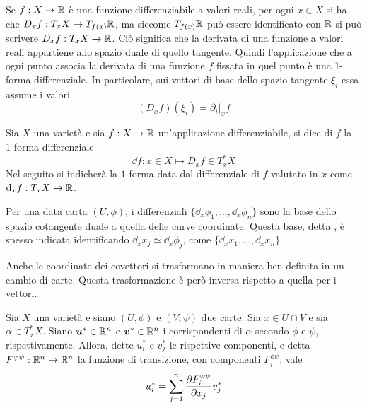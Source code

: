 Se $f:X \to \mathbb{R}$ è una funzione differenziabile a valori reali, per ogni $x \in X$ si ha che $D_x f: T_x X \to T_{f(x)}\mathbb{R}$, ma siccome $T_{f(x)}\mathbb{R}$ può essere identificato con $\mathbb{R}$ si può scrivere $D_x f: T_x X \to \mathbb{R}$. Ciò significa che la derivata di una funzione a valori reali appartiene allo spazio duale di quello tangente. Quindi l'applicazione che a ogni punto associa la derivata di una funzione $f$ fissata in quel punto è una 1-forma differenziale. In particolare, sui vettori di base dello spazio tangente $\xi_i$ essa assume i valori \begin{equation}
(D_x f)(\xi_i) = \partial_i|_x f
\end{equation} 
\begin{definition} \label{def:differential}
  Sia $X$ una varietà e sia $f:X\to \mathbb{R}$ un'applicazione differenziabile, si dice  di $f$ la 1-forma differenziale \begin{equation}
  \dd f: x \in X \mapsto D_x f \in T_x^* X
  \end{equation}
  Nel seguito si indicherà la $1$-forma data dal differenziale di $f$ valutato in $x$ come $\dd_x f:T_x X \to \mathbb{R}$.
\end{definition}
\begin{remark}
  Per una data carta $(U,\phi)$, i differenziali $\{ \dd_x{\phi_1}, \ldots, \dd_x{\phi_n}\}$ sono la base dello spazio cotangente duale a quella delle curve coordinate. Questa base, detta , è spesso indicata identificando $\dd_x{x_j} \simeq \dd_x{\phi_j}$, come $\{ \dd_x x_1, \ldots, \dd_x x_n\}$ 
\end{remark}
Anche le coordinate dei covettori si trasformano in maniera ben definita in un cambio di carte. Questa trasformazione è però inversa rispetto a quella per i vettori.

\begin{theorem} 
  Sia $X$ una varietà e siano $(U,\phi)$ e $(V,\psi)$ due carte. Sia $x \in  U \cap V$ e sia $\alpha \in  T_x^* X$. Siano $\boldsymbol{u}^* \in \mathbb{R}^{n}$ e $\boldsymbol{v}^* \in  \mathbb{R}^{n}$ i corrispondenti di $\alpha$ secondo $\phi$ e $\psi$, rispettivamente. Allora, dette $u^*_i$ e $v^*_j$ le rispettive componenti, e detta $F^{\varphi\psi}:\mathbb{R}^{n} \to \mathbb{R}^{n}$ la funzione di transizione, con componenti $F^{\phi \psi}_i$, vale \begin{equation} \label{eq:cvcTrans}
  u^*_i = \sum_{j=1}^n \pdv{F^{\varphi\psi}_i}{x_j} v^*_j
  \end{equation} 
\end{theorem}

